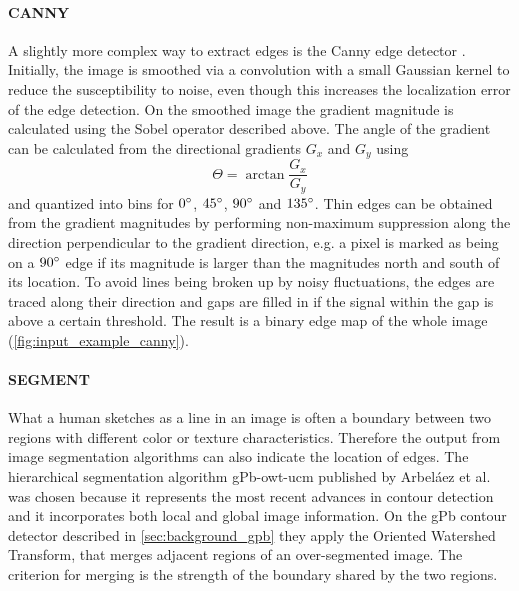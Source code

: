 \paragraph{CANNY}

A slightly more complex way to extract edges is the Canny edge detector
\autocite{canny_computational_1986}. Initially, the image is smoothed via a
convolution with a small Gaussian kernel to reduce the susceptibility to noise,
even though this increases the localization error of the edge detection. On the
smoothed image the gradient magnitude is calculated using the Sobel operator
described above. The angle of the gradient can be calculated from the
directional gradients $G_x$ and $G_y$ using
\begin{equation*}
    \Theta = \arctan{\frac{G_x}{G_y}}
\end{equation*}
and quantized into bins for $0 \degree$, $45 \degree$, $90 \degree$ and $135
\degree$. Thin edges can be obtained from the gradient magnitudes by performing
non-maximum suppression along the direction perpendicular to the gradient
direction, e.g. a pixel is marked as being on a $90 \degree$ edge if its
magnitude is larger than the magnitudes north and south of its location. To
avoid lines being broken up by noisy fluctuations, the edges are traced along
their direction and gaps are filled in if the signal within the gap is above a
certain threshold. The result is a binary edge map of the whole image
(\autoref{fig:input_example_canny}).

\paragraph{SEGMENT}

What a human sketches as a line in an image is often a boundary between two
regions with different color or texture characteristics. Therefore the output
from image segmentation algorithms can also indicate the location of edges. The
hierarchical segmentation algorithm gPb-owt-ucm published by Arbeláez et al.\ 
\autocite{arbelaez_contours_2009} \autocite{arbelaez_contour_2011} was chosen
because it represents the most recent advances in contour detection and it
incorporates both local and global image information. On the gPb contour
detector described in \autoref{sec:background_gpb} they apply the Oriented
Watershed Transform, that merges adjacent regions of an over-segmented image.
The criterion for merging is the strength of the boundary shared by the two
regions.

